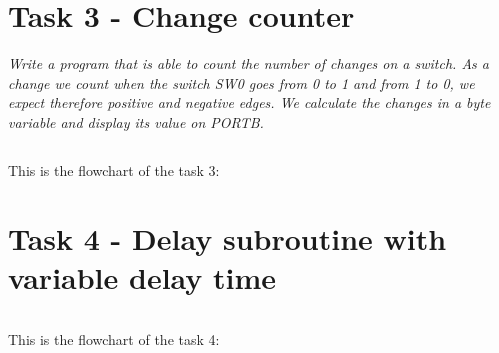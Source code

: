 \documentclass[a4paper,12pt]{article}
\begin{document}
\newpage
\section{Task 3 - Change counter}
\textit{Write a program that is able to count the number of changes on a switch. As a change we count
when the switch SW0 goes from 0 to 1 and from 1 to 0, we expect therefore positive and negative
edges. We calculate the changes in a byte variable and display its value on PORTB.}

\lstset{style=Asm}
\begin{lstlisting}

\end{lstlisting}

\newpage
This is the flowchart of the task 3:
\begin{center}
\end{center}

\newpage
\section{Task 4 - Delay subroutine with variable delay time}

\lstset{style=Asm}
\begin{lstlisting}

\end{lstlisting}

\newpage
This is the flowchart of the task 4:
\begin{center}
\end{center}


\end{document}
